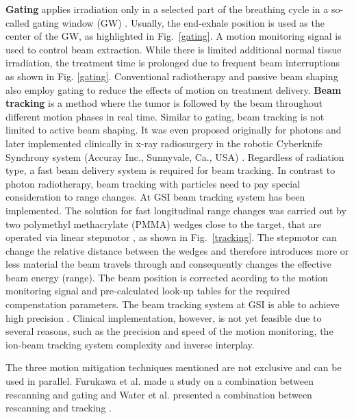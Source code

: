 \textbf{Gating} applies irradiation only in a selected part of the breathing cycle in a so-called gating window (GW) \cite{Minohara2000,Lu2006}. Usually, the end-exhale position is used as the center of the GW, as highlighted in Fig.~\ref{gating}.
A motion monitoring signal is used to control beam extraction. While there is limited additional normal tissue irradiation, the treatment time is prolonged due to frequent beam interruptions as shown in Fig. \ref{gating}.
Conventional radiotherapy and passive beam shaping also employ gating to reduce the effects of motion on treatment delivery.
\newline
\textbf{Beam tracking} is a method where the tumor is followed by the beam throughout different motion phases in real time. Similar to gating, beam tracking is not limited to active beam shaping. It was even proposed originally 
for photons \cite{Keall2001} and later implemented clinically in x-ray radiosurgery in the robotic Cyberknife Synchrony system (Accuray Inc., Sunnyvale, Ca., USA) \cite{Brown2007a,Kilby2010}. Regardless of radiation type, a
fast beam delivery system is required for beam tracking. In contrast to photon radiotherapy, beam tracking with particles need to pay special consideration to range changes. At GSI beam tracking system has been implemented.
The solution for fast longitudinal range changes was carried out by two polymethyl methacrylate (PMMA) wedges close to the target, that are operated via linear stepmotor \cite{Saito2009}, as shown in Fig.~\ref{tracking}. The stepmotor can
change the relative distance between the wedges and therefore introduces more or less material the beam travels through and consequently changes the effective beam energy (range). The beam position is corrected acording to the motion monitoring
signal and pre-calculated look-up tables for the required compenstation parameters. The beam tracking system at GSI is able to achieve high precision \cite{Bert2007, Bert2009, Saito2009}.
Clinical implementation, however, is not yet feasible due to several reasons, such as the precision and speed of the motion monitoring, the ion-beam tracking system complexity and inverse interplay.


The three motion mitigation techniques mentioned are not exclusive and can be used in parallel. Furukawa et al. made a study on a combination between rescanning and gating \cite{Furukawa2007} and Water et al. presented a combination
between rescanning and tracking \cite{Water2009}.

